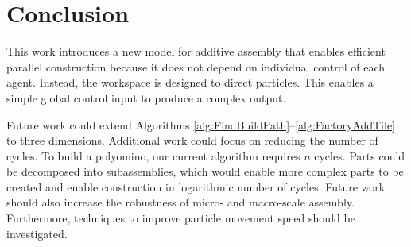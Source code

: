 
\section{Conclusion}\label{sec:Conclusion}

This work introduces a new model for additive assembly that enables efficient parallel construction because it does not depend on individual control of each agent.
Instead,   the workspace is designed  to direct particles. 
 This enables  a simple global control input to produce a complex output.

  
 
  

Future work could extend Algorithms \ref{alg:FindBuildPath}--\ref{alg:FactoryAddTile} to three dimensions. 
Additional work could focus on reducing the number of cycles. To build a polyomino, our current algorithm requires $n$ cycles.  
Parts could be decomposed into subassemblies, which would enable more complex parts to be created and enable construction in logarithmic number of cycles. Future work should also increase the robustness of micro- and macro-scale assembly. 
Furthermore, techniques to improve particle movement speed should be investigated.


    